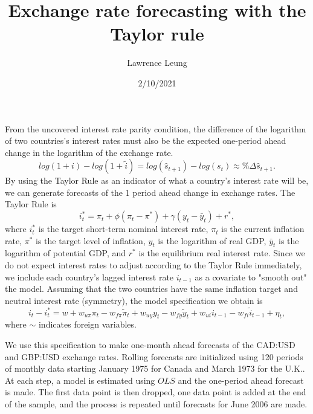 \documentclass{article}
\title{Exchange rate forecasting with the Taylor rule}
\author{Lawrence Leung}
\date{2/10/2021}
\begin{document}
\maketitle

From the uncovered interest rate parity condition, the difference of the logarithm of two countries's interest rates must also be the expected one-period ahead change in the logarithm of the exchange rate. 
\begin{equation}
log(1+i)-log(1+\tilde{i}) = log(\hat{s}_{t+1}) - log(s_t) \approx \%\Delta \hat{s}_{t+1}.
\end{equation}
By using the Taylor Rule as an indicator of what a country's interest rate will be, we can generate forecasts of the 1 period ahead change in exchange rates. The Taylor Rule is
\begin{equation}
i_t^* = \pi_t + \phi(\pi_t-\pi^*) + \gamma(y_t-\bar{y}_t) + r^*,
\end{equation}
where $i_t^*$ is the target short-term nominal interest rate, $\pi_t$ is the current inflation rate, $\pi^*$ is the target level of inflation, $y_t$ is the logarithm of real GDP, $\bar{y}_t$ is the logarithm of potential GDP, and $r^*$ is the equilibrium real interest rate. Since we do not expect interest rates to adjust according to the Taylor Rule immediately, we include each country's lagged interest rate $i_{t-1}$ as a covariate to "smooth out" the model. Assuming that the two countries have the same inflation target and neutral interest rate (symmetry), the model specification we obtain is
\begin{equation}
i_t-i_t^*=w+w_{u\pi}\pi_t-w_{f\pi}\tilde{\pi}_t+w_{uy}y_t-w_{fy}\tilde{y}_t+w_{ui}i_{t-1}-w_{fi}\tilde{i}_{t-1}+\eta_t,
\end{equation}
where $\sim$ indicates foreign variables. 


We use this specification to make one-month ahead forecasts of the CAD:USD and GBP:USD exchange rates. Rolling forecasts are initialized using 120 periods of monthly data starting January 1975 for Canada and March 1973 for the U.K.. At each step, a model is estimated using $OLS$ and the one-period ahead forecast is made. The first data point is then dropped, one data point is added at the end of the sample, and the process is repeated until forecasts for June 2006 are made.
\end{document}
